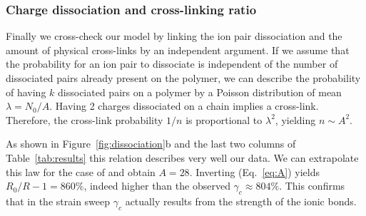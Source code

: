 \documentclass[journal=jacsat,manuscript=article]{achemso}
\begin{document}
\subsubsection{Charge dissociation and cross-linking ratio}

Finally we cross-check our model by linking the ion pair dissociation and the amount of physical cross-links by an independent argument. If we assume that the probability for an ion pair to dissociate is independent of the number of dissociated pairs already present on the polymer, we can describe the probability of having $k$ dissociated pairs on a polymer by a Poisson distribution of mean $\lambda = N_0/A$. Having 2 charges dissociated on a chain implies a cross-link. Therefore, the cross-link probability $1/n$ is proportional to $\lambda^2$, yielding $n \sim A^2$.

As shown in Figure~\ref{fig:dissociation}b and the last two columns of Table~\ref{tab:results} this relation describes very well our data. We can extrapolate this law for the case of  and obtain $A = 28$. Inverting (Eq.~\ref{eq:A}) yields $R_0/R - 1 = 860\%$, indeed higher than the observed $\gamma_c\approx 804\%$. This confirms that in the  strain sweep $\gamma_c$ actually results from the strength of the ionic bonds.

\end{document}
